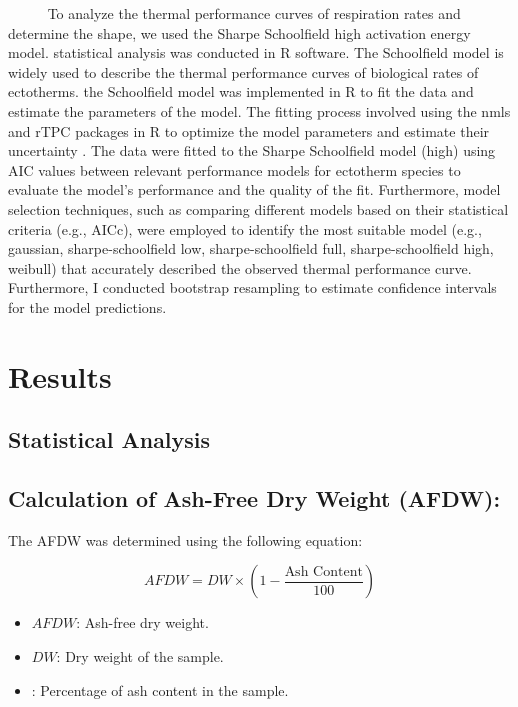 \documentclass[
  12pt,
]{article}
\begin{document}
~~~~~ To analyze the thermal performance curves of respiration rates and
determine the shape, we used the Sharpe Schoolfield high activation
energy model. statistical analysis was conducted in R software. The
Schoolfield model is widely used to describe the thermal performance
curves of biological rates of ectotherms. the Schoolfield model was
implemented in R to fit the data and estimate the parameters of the
model. The fitting process involved using the nmls and rTPC packages in
R to optimize the model parameters and estimate their uncertainty
\citep{padfield2021rtpc}. The data were fitted to the Sharpe Schoolfield
model (high) using AIC values between relevant performance models for
ectotherm species to evaluate the model's performance and the quality of
the fit. Furthermore, model selection techniques, such as comparing
different models based on their statistical criteria (e.g., AICc), were
employed to identify the most suitable model (e.g., gaussian,
sharpe-schoolfield low, sharpe-schoolfield full, sharpe-schoolfield
high, weibull) that accurately described the observed thermal
performance curve. Furthermore, I conducted bootstrap resampling to
estimate confidence intervals for the model predictions. \newpage

\hypertarget{results}{%
\section{Results}\label{results}}

\hypertarget{statistical-analysis}{%
\subsection{Statistical Analysis}\label{statistical-analysis}}

\subsection*{Calculation of Ash-Free Dry Weight (AFDW):}

The AFDW was determined using the following equation:

\[
AFDW = DW \times \left(1 - \frac{{\text{Ash Content}}}{{100}}\right)
\]

\begin{itemize}
    \item \( AFDW \): Ash-free dry weight.
    \item \( DW \): Dry weight of the sample.
    \item {}: Percentage of ash content in the sample.
\end{itemize}
\end{document}
